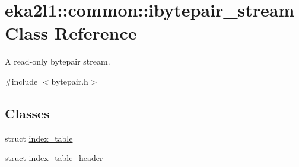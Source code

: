 \hypertarget{classeka2l1_1_1common_1_1ibytepair__stream}{}\section{eka2l1\+:\+:common\+:\+:ibytepair\+\_\+stream Class Reference}
\label{classeka2l1_1_1common_1_1ibytepair__stream}


A read-\/only bytepair stream.  




{\ttfamily \#include $<$bytepair.\+h$>$}

\subsection*{Classes}
\begin{DoxyCompactItemize}
\item 
struct \mbox{\hyperlink{structeka2l1_1_1common_1_1ibytepair__stream_1_1index__table}{index\+\_\+table}}
\item 
struct \mbox{\hyperlink{structeka2l1_1_1common_1_1ibytepair__stream_1_1index__table__header}{index\+\_\+table\+\_\+header}}
\end{DoxyCompactItemize}
